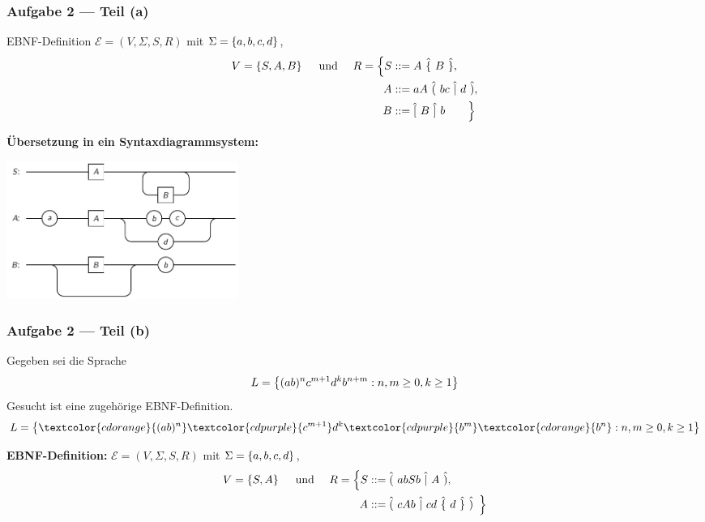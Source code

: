 \documentclass{beamer}
\newcommand{\wdh}[1]{\hat{\{} \ #1 \ \hat{\}}}
\newcommand{\opt}[2]{\hat{(} \ #1 \ \hat{|} \ #2 \ \hat{)}}
\newcommand{\byp}[1]{\hat{[} \ #1 \ \hat{]}}
\begin{document}
\begin{frame} \frametitle{Aufgabe 2 --- Teil (a)}
	\small
	EBNF-Definition $\mathcal{E} = (V,\Sigma,S,R)$ mit $\Sigma = \left\{ a,b,c,d \right\}$,
	\begin{align*}
		V = \menge{S,A,B} 
		\quad \und \quad
		R = \Big\{ S &::= A \ \wdh{B} , \\ 
				   A &::= aA \  \opt{bc}{d} , \\
				   B &::= \byp{B} \ b 
		    \qquad \Big\}
	\end{align*}

	\pause
	
	\textbf{Übersetzung in ein Syntaxdiagrammsystem:}
	
	\centering
	\includegraphics[height=4.5cm]{tut02_syntax-dia-2a.pdf}
\end{frame}

\begin{frame} \frametitle{Aufgabe 2 --- Teil (b)}
	Gegeben sei die Sprache
	\begin{equation*}
		L = \left\{ (ab)^n c^{m+1} d^k b^{n+m} : n,m \ge 0, k \ge 1 \right\}
	\end{equation*}
	Gesucht ist eine zugehörige EBNF-Definition. \pause
	\begin{equation*}
		L = \menge{\textcolor{cdorange}{(ab)^n} \textcolor{cdpurple}{c^{m+1}} d^k \textcolor{cdpurple}{b^m} \textcolor{cdorange}{b^n} : n,m \ge 0, k \ge 1}
	\end{equation*}
	\pause 
	
	\textbf{EBNF-Definition:} $\mathcal{E} = (V,\Sigma,S,R)$ mit $\Sigma = \left\{ a,b,c,d \right\}$, 
	\begin{align*}
		V = \menge{S,A} \quad \und \quad
		R = \Big\{ 
			S &::= \opt{abSb}{A}, \\
			A &::= \opt{cAb}{cd \ \wdh{d}} \enskip 
		\Big\}
	\end{align*}
\end{frame}
\end{document}

